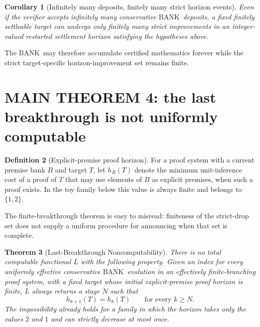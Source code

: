 \documentclass[11pt]{article}
\newtheorem{theorem}{Theorem}[section]
\newtheorem{corollary}[theorem]{Corollary}
\theoremstyle{definition}
\newtheorem{definition}[theorem]{Definition}
\newcommand{\BANK}{\ensuremath{\mathrm{BANK}}}
\begin{document}
\begin{corollary}[Infinitely many deposits, finitely many strict horizon events]
Even if the verifier accepts infinitely many conservative \BANK\ deposits, a fixed finitely settleable target can undergo only finitely many strict improvements in an integer-valued restarted settlement horizon satisfying the hypotheses above.
\end{corollary}

The \BANK\ may therefore accumulate certified mathematics forever while the strict target-specific horizon-improvement set remains finite.

\section{MAIN THEOREM 4: the last breakthrough is not uniformly computable}
\begin{definition}[Explicit-premise proof horizon]
For a proof system with a current premise bank $B$ and target $T$, let $h_B(T)$ denote the minimum unit-inference cost of a proof of $T$ that may use elements of $B$ as explicit premises, when such a proof exists. In the toy family below this value is always finite and belongs to $\{1,2\}$.
\end{definition}

The finite-breakthrough theorem is easy to misread: finiteness of the strict-drop set does not supply a uniform procedure for announcing when that set is complete.

\begin{theorem}[Last-Breakthrough Noncomputability]
There is no total computable functional $L$ with the following property. Given an index for every uniformly effective conservative \BANK\ evolution in an effectively finite-branching proof system, with a fixed target whose initial explicit-premise proof horizon is finite, $L$ always returns a stage $N$ such that
\[
h_{k+1}(T)=h_k(T)\qquad\text{for every }k\ge N.
\]
The impossibility already holds for a family in which the horizon takes only the values $2$ and $1$ and can strictly decrease at most once.
\end{theorem}
\end{document}
